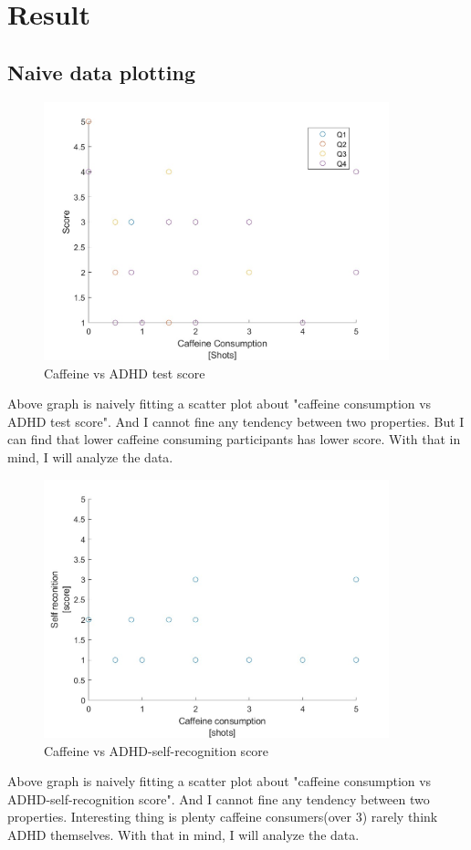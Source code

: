 \documentclass[12pt]{article}
\begin{document}
\section{Result}

\subsection{Naive data plotting}
\begin{figure}[h]
    \includegraphics[width = 10cm]{pic1.jpg}
    \centering
    \caption{Caffeine vs ADHD test score}
\end{figure}
\quad Above graph is naively fitting a scatter plot about "caffeine consumption vs ADHD test score". And I cannot fine any tendency between two properties. But I can find that lower caffeine consuming participants has lower score. With that in mind, I will analyze the data. 

\begin{center}
    
\end{center}
\begin{figure}[h]
    \includegraphics[width = 10cm]{pic2.jpg}
    \centering
    \caption{Caffeine vs ADHD-self-recognition score}
\end{figure}
\quad Above graph is naively fitting a scatter plot about "caffeine consumption vs ADHD-self-recognition score". And I cannot fine any tendency between two properties. Interesting thing is plenty caffeine consumers(over 3) rarely think ADHD themselves. With that in mind, I will analyze the data.
\end{document}
